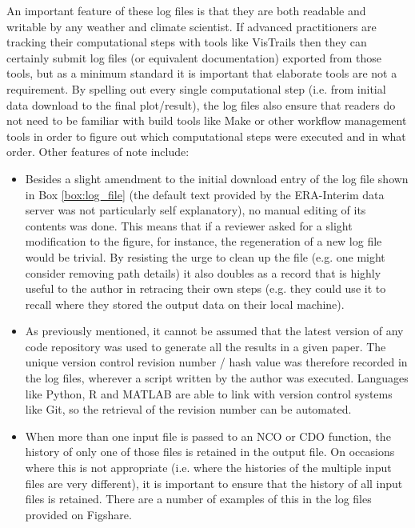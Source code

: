 An important feature of these log files is that they are both readable and writable by any weather and climate scientist. If advanced practitioners are tracking their computational steps with tools like VisTrails then they can certainly submit log files (or equivalent documentation) exported from those tools, but as a minimum standard it is important that elaborate tools are not a requirement. By spelling out every single computational step (i.e. from initial data download to the final plot/result), the log files also ensure that readers do not need to be familiar with build tools like Make or other workflow management tools in order to figure out which computational steps were executed and in what order. Other features of note include:
\begin{itemize}
\item Besides a slight amendment to the initial download entry of the log file shown in Box \ref{box:log_file} (the default text provided by the ERA-Interim data server was not particularly self explanatory), no manual editing of its contents was done. This means that if a reviewer asked for a slight modification to the figure, for instance, the regeneration of a new log file would be trivial. By resisting the urge to clean up the file (e.g. one might consider removing path details) it also doubles as a record that is highly useful to the author in retracing their own steps (e.g. they could use it to recall where they stored the output data on their local machine).
\item As previously mentioned, it cannot be assumed that the latest version of any code repository was used to generate all the results in a given paper. The unique version control revision number / hash value was therefore recorded in the log files, wherever a script written by the author was executed. Languages like Python, R and MATLAB are able to link with version control systems like Git, so the retrieval of the revision number can be automated.
\item When more than one input file is passed to an NCO or CDO function, the history of only one of those files is retained in the output file. On occasions where this is not appropriate (i.e. where the histories of the multiple input files are very different), it is important to ensure that the history of all input files is retained. There are a number of examples of this in the log files provided on Figshare. 
\end{itemize}
  

